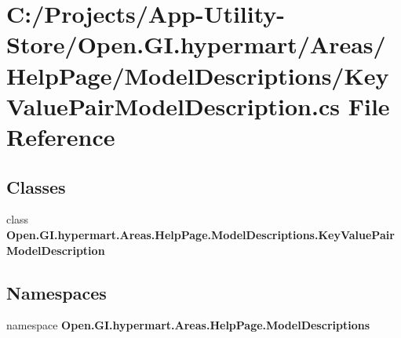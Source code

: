 \section{C\+:/\+Projects/\+App-\/\+Utility-\/\+Store/\+Open.G\+I.\+hypermart/\+Areas/\+Help\+Page/\+Model\+Descriptions/\+Key\+Value\+Pair\+Model\+Description.cs File Reference}
\label{_key_value_pair_model_description_8cs}
\subsection*{Classes}
\begin{DoxyCompactItemize}
\item 
class \textbf{ Open.\+G\+I.\+hypermart.\+Areas.\+Help\+Page.\+Model\+Descriptions.\+Key\+Value\+Pair\+Model\+Description}
\end{DoxyCompactItemize}
\subsection*{Namespaces}
\begin{DoxyCompactItemize}
\item 
namespace \textbf{ Open.\+G\+I.\+hypermart.\+Areas.\+Help\+Page.\+Model\+Descriptions}
\end{DoxyCompactItemize}
